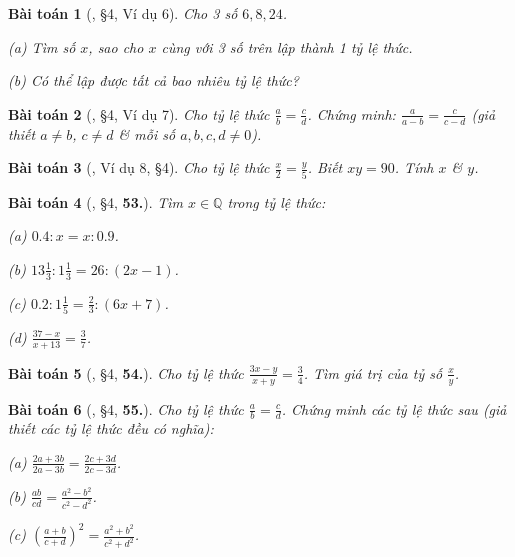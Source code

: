 \documentclass{article}
\numberwithin{equation}{section}
\newtheorem{baitoan}{Bài toán}[section]
\begin{document}
\begin{baitoan}[\cite{Binh_Toan_7_tap_1}, \S4, Ví dụ 6]
	Cho 3 số $6,8,24$.
	\begin{enumerate*}
		\item[(a)] Tìm số $x$, sao cho $x$ cùng với 3 số trên lập thành 1 tỷ lệ thức.
		\item[(b)] Có thể lập được tất cả bao nhiêu tỷ lệ thức?
	\end{enumerate*}
\end{baitoan}

\begin{baitoan}[\cite{Binh_Toan_7_tap_1}, \S4, Ví dụ 7]
	Cho tỷ lệ thức $\frac{a}{b} = \frac{c}{d}$. Chứng minh: $\frac{a}{a - b} = \frac{c}{c - d}$ (giả thiết $a\ne b$, $c\ne d$ \& mỗi số $a,b,c,d\ne 0$).
\end{baitoan}

\begin{baitoan}[\cite{Binh_Toan_7_tap_1}, Ví dụ 8, \S4]
	Cho tỷ lệ thức $\frac{x}{2} = \frac{y}{5}$. Biết $xy = 90$. Tính $x$ \& $y$.
\end{baitoan}

\begin{baitoan}[\cite{Binh_Toan_7_tap_1}, \S4, \textbf{53.}]
	Tìm $x\in\mathbb{Q}$ trong tỷ lệ thức:
	\begin{enumerate*}
		\item[(a)] $0.4:x = x:0.9$.
		\item[(b)] $13\frac{1}{3}:1\frac{1}{3} = 26:(2x - 1)$.
		\item[(c)] $0.2:1\frac{1}{5} = \frac{2}{3}:(6x + 7)$.
		\item[(d)] $\frac{37 - x}{x + 13} = \frac{3}{7}$.
	\end{enumerate*}
\end{baitoan}

\begin{baitoan}[\cite{Binh_Toan_7_tap_1}, \S4, \textbf{54.}]
	Cho tỷ lệ thức $\frac{3x - y}{x + y} = \frac{3}{4}$. Tìm giá trị của tỷ số $\frac{x}{y}$.
\end{baitoan}

\begin{baitoan}[\cite{Binh_Toan_7_tap_1}, \S4, \textbf{55.}]
	Cho tỷ lệ thức $\frac{a}{b} = \frac{c}{d}$. Chứng minh các tỷ lệ thức sau (giả thiết các tỷ lệ thức đều có nghĩa):
	\begin{enumerate*}
		\item[(a)] $\frac{2a + 3b}{2a - 3b} = \frac{2c + 3d}{2c - 3d}$.
		\item[(b)] $\frac{ab}{cd} = \frac{a^2 - b^2}{c^2 - d^2}$.
		\item[(c)] $\left(\frac{a + b}{c + d}\right)^2 = \frac{a^2 + b^2}{c^2 + d^2}$.
	\end{enumerate*}
\end{baitoan}
\end{document}
